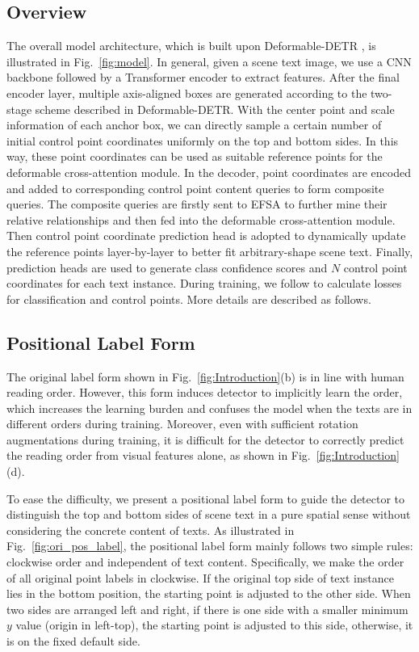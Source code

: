 \documentclass[letterpaper]{article} \usepackage{aaai23}  \usepackage{times}  \usepackage{helvet}  \usepackage{courier}  \usepackage[hyphens]{url}  \usepackage{graphicx} \urlstyle{rm}
\begin{document}
\subsection{Overview}
The overall model architecture, which is built upon Deformable-DETR \cite{zhu2020deformable}, is illustrated in Fig.~\ref{fig:model}. In general, given a scene text image, we use a CNN backbone followed by a Transformer encoder to extract features.
After the final encoder layer, multiple axis-aligned boxes are generated according to the two-stage scheme described in Deformable-DETR. With the center point and scale information of each anchor box, we can directly sample a certain number of initial control point coordinates uniformly on the top and bottom sides. In this way, these point coordinates can be used as suitable reference points for the deformable cross-attention module.
In the decoder, point coordinates are encoded and added to corresponding control point content queries to form composite queries. The composite queries are firstly sent to EFSA to further mine their relative relationships and then fed into the deformable cross-attention module. Then control point coordinate prediction head is adopted to dynamically update the reference points layer-by-layer to better fit arbitrary-shape scene text. Finally, prediction heads are used to generate class confidence scores and $N$ control point coordinates for each text instance. During training, we follow \cite{zhang2022text} to calculate losses for classification and control points. More details are described as follows.

\subsection{Positional Label Form}
\label{pos.label}
The original label form shown in Fig.~\ref{fig:Introduction}(b) is in line with human reading order. However, this form induces detector to implicitly learn the order, which increases the learning burden and confuses the model when the texts are in different orders during training. Moreover, even with sufficient rotation augmentations during training, it is difficult for the detector to correctly predict the reading order from visual features alone, as shown in Fig.~\ref{fig:Introduction}(d).

To ease the difficulty, we present a positional label form to guide the detector to distinguish the top and bottom sides of scene text in a pure spatial sense without considering the concrete content of texts. As illustrated in Fig.~\ref{fig:ori_pos_label}, the positional label form mainly follows two simple rules: clockwise order and independent of text content. Specifically, we make the order of all original point labels in clockwise. If the original top side of text instance lies in the bottom position, the starting point is adjusted to the other side. When two sides are arranged left and right, if there is one side with a smaller minimum $y$ value (origin in left-top), the starting point is adjusted to this side, otherwise, it is on the fixed default side.
\end{document}
